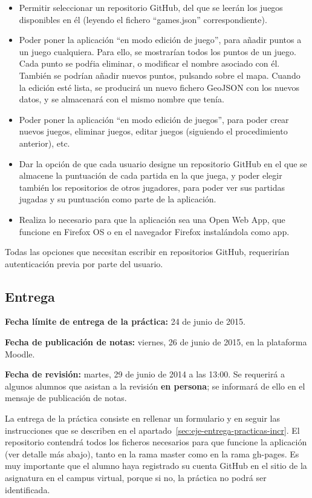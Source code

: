 \begin{itemize}
\item Permitir seleccionar un repositorio GitHub, del que se leerán los juegos disponibles en él (leyendo el fichero ``games.json'' correspondiente).
\item Poder poner la aplicación ``en modo edición de juego'', para añadir puntos a un juego cualquiera. Para ello, se mostrarían todos los puntos de un juego. Cada punto se podŕia eliminar, o modificar el nombre asociado con él. También se podrían añadir nuevos puntos, pulsando sobre el mapa. Cuando la edición esté lista, se producirá un nuevo fichero GeoJSON con los nuevos datos, y se almacenará con el mismo nombre que tenía.
\item Poder poner la aplicación ``en modo edición de juegos'', para poder crear nuevos juegos, eliminar juegos, editar juegos (siguiendo el procedimiento anterior), etc.
\item Dar la opción de que cada usuario designe un repositorio GitHub en el que se almacene la puntuación de cada partida en la que juega, y poder elegir también los repositorios de otros jugadores, para poder ver sus partidas jugadas y su puntuación como parte de la aplicación.
\item Realiza lo necesario para que la aplicación sea una Open Web App, que funcione en Firefox OS o en el navegador Firefox instalándola como app.
\end{itemize}

Todas las opciones que necesitan escribir en repositorios GitHub, requerirían autenticación previa por parte del usuario.

\subsection{Entrega}

\textbf{Fecha límite de entrega de la práctica:} 24 de junio de 2015.

\textbf{Fecha de publicación de notas:} viernes, 26 de junio de 2015, en la plataforma Moodle.

\textbf{Fecha de revisión:} martes, 29 de junio de 2014 a las 13:00. Se requerirá a algunos alumnos que asistan a la revisión {\bf en persona}; se informará de ello en el mensaje de publicación de notas.

La entrega de la práctica consiste en rellenar un formulario y en seguir las instrucciones que se describen en el apartado~\ref{sec:eje-entrega-practicas-incr}. El repositorio contendrá todos los ficheros necesarios para que funcione la aplicación (ver detalle más abajo), tanto en la rama master como en la rama gh-pages. Es muy importante que el alumno haya registrado su cuenta GitHub en el sitio de la asignatura en el campus virtual, porque si no, la práctica no podrá ser identificada.

